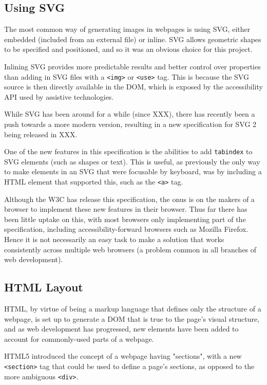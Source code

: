 \documentclass[ %
                    author={Aleena Baig},
                supervisor={Dr Simon Lock},
                    degree={BSc},
                     title={On Making Web Accessible Graphs},
                  subtitle={},
                      year={2019} ]{dissertation}
\begin{document}
\subsection{Using SVG}

The most common way of generating images in webpages is using SVG, either embedded (included from an external file) or inline. SVG allows geometric shapes to be specified and positioned, and so it was an obvious choice for this project.

Inlining SVG provides more predictable results and better control over properties than adding in SVG files with a \texttt{<img>} or \texttt{<use>} tag. This is because the SVG source is then directly available in the DOM, which is exposed by the accessibility API used by assistive technologies.

While SVG has been around for a while (since XXX), there has recently been a push towards a more modern version, resulting in a new specification for SVG 2 being released in XXX.

One of the new features in this specification is the abilities to add \texttt{tabindex} to SVG elements (such as shapes or text). This is useful, as previously the only way to make elements in an SVG that were focusable by keyboard, was by including a HTML element that supported this, such as the \texttt{<a>} tag.

Although the W3C has release this specification, the onus is on the makers of a browser to implement these new features in their browser. Thus far there has been little uptake on this, with most browsers only implementing part of the specification, including accessibility-forward browsers such as Mozilla Firefox. Hence it is not necessarily an easy task to make a solution that works consistently across multiple web browsers (a problem common in all branches of web development).


\subsection{HTML Layout}

HTML, by virtue of being a markup language that defines only the structure of a webpage, is set up to generate a DOM that is true to the page's visual structure, and as web development has progressed, new elements have been added to account for commonly-used parts of a webpage.

HTML5 introduced the concept of a webpage having "sections", with a new \texttt{<section>} tag that could be used to define a page's sections, as opposed to the more ambiguous \texttt{<div>}.
\end{document}

